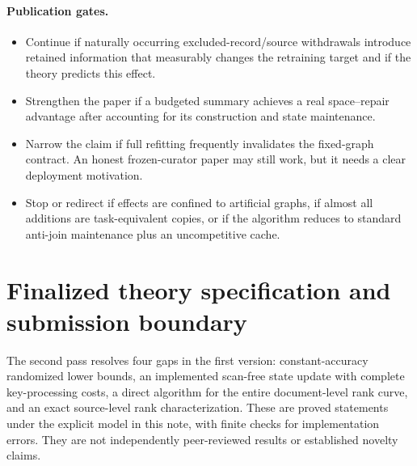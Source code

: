 \documentclass[11pt,a4paper]{article}
\theoremstyle{definition}\newtheorem{definition}[theorem]{Definition}
\begin{document}
\paragraph{Publication gates.}
\begin{itemize}
\item Continue if naturally occurring excluded-record/source withdrawals introduce retained information that measurably changes the retraining target and if the theory predicts this effect.
\item Strengthen the paper if a budgeted summary achieves a real space--repair advantage after accounting for its construction and state maintenance.
\item Narrow the claim if full refitting frequently invalidates the fixed-graph contract. An honest frozen-curator paper may still work, but it needs a clear deployment motivation.
\item Stop or redirect if effects are confined to artificial graphs, if almost all additions are task-equivalent copies, or if the algorithm reduces to standard anti-join maintenance plus an uncompetitive cache.
\end{itemize}

\section{Finalized theory specification and submission boundary}
The second pass resolves four gaps in the first version: constant-accuracy randomized lower bounds, an implemented scan-free state update with complete key-processing costs, a direct algorithm for the entire document-level rank curve, and an exact source-level rank characterization. These are proved statements under the explicit model in this note, with finite checks for implementation errors. They are not independently peer-reviewed results or established novelty claims.
\end{document}
